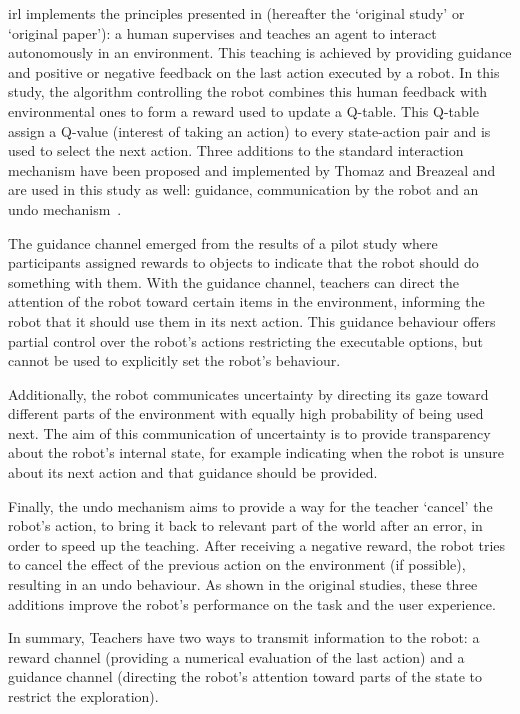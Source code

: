 \gls{irl} implements the principles presented in \cite{thomaz2008teachable}(hereafter the `original study' or `original paper'): a human supervises and teaches an agent to interact autonomously in an environment. This teaching is achieved by providing guidance and positive or negative feedback on the last action executed by a robot. In this study, the algorithm controlling the robot combines this human feedback with environmental ones to form a reward used to update a Q-table. This Q-table assign a Q-value (interest of taking an action) to every state-action pair and is used to select the next action. Three additions to the standard interaction mechanism have been proposed and implemented by Thomaz and Breazeal and are used in this study as well: guidance, communication by the robot and an undo mechanism~\citep{thomaz2008teachable}. 

The guidance channel emerged from the results of a pilot study where participants assigned rewards to objects to indicate that the robot should do something with them. With the guidance channel, teachers can direct the attention of the robot toward certain items in the environment, informing the robot that it should use them in its next action. This guidance behaviour offers partial control over the robot's actions restricting the executable options, but cannot be used to explicitly set the robot's behaviour. 

Additionally, the robot communicates uncertainty by directing its gaze toward different parts of the environment with equally high probability of being used next. The aim of this communication of uncertainty is to provide transparency about the robot's internal state, for example indicating when the robot is unsure about its next action and that guidance should be provided. 

Finally, the undo mechanism aims to provide a way for the teacher `cancel' the robot's action, to bring it back to relevant part of the world after an error, in order to speed up the teaching. After receiving a negative reward, the robot tries to cancel the effect of the previous action on the environment (if possible), resulting in an undo behaviour. As shown in the original studies, these three additions improve the robot's performance on the task and the user experience.

In summary, Teachers have two ways to transmit information to the robot: a reward channel (providing a numerical evaluation of the last action) and a guidance channel (directing the robot's attention toward parts of the state to restrict the exploration).

